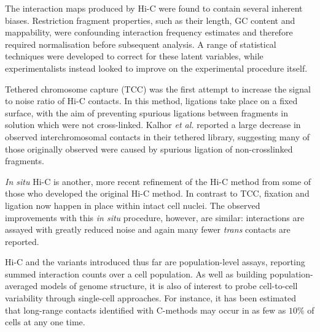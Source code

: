 \documentclass[a4paper,11pt,oneside]{book}
\begin{document}
The interaction maps produced by Hi-C were found to contain several inherent biases. Restriction fragment properties, such as their length, GC content and mappability, were confounding interaction frequency estimates and therefore required normalisation before subsequent analysis.\cite{Yaffe2011, Hu2013} A range of statistical techniques were developed to correct for these latent variables,\cite{Imakaev2012, Dekker2013, Hu2012, Li2014} while experimentalists instead looked to improve on the experimental procedure itself.

Tethered chromosome capture (TCC)\cite{Kalhor2012} was the first attempt to increase the signal to noise ratio of Hi-C contacts. In this method, ligations take place on a fixed surface, with the aim of preventing spurious ligations between fragments in solution which were not cross-linked. Kalhor \emph{et al.}\cite{Kalhor2012} reported a large decrease in observed interchromosomal contacts in their tethered library, suggesting many of those originally observed were caused by spurious ligation of non-crosslinked fragments.

\emph{In situ} Hi-C is another, more recent refinement of the Hi-C method from some of those who developed the original Hi-C method.\cite{Rao2014} In contrast to TCC, fixation and ligation now happen in place within intact cell nuclei. The observed improvements with this \emph{in situ} procedure, however, are similar: interactions are assayed with greatly reduced noise and again many fewer \emph{trans} contacts are reported.\cite{Nagano2015}

Hi-C and the variants introduced thus far are population-level assays, reporting summed interaction counts over a cell population. As well as building population-averaged models of genome structure, it is also of interest to probe cell-to-cell variability through single-cell approaches. For instance, it has been estimated that long-range contacts identified with C-methods may occur in as few as $10\%$ of cells at any one time.\cite{VanSteensel2010} 
\end{document}
